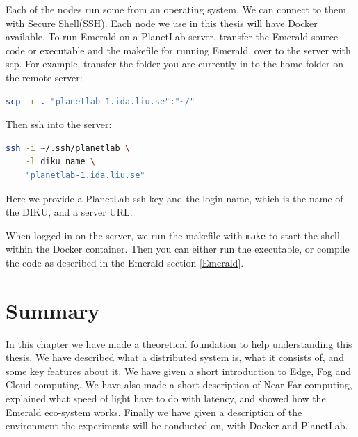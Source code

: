 Each of the nodes run some from an operating system. We can connect to them with Secure Shell(SSH). Each node we use in this thesis will have Docker available. To run Emerald on a PlanetLab server, transfer the Emerald source code or executable and the makefile for running Emerald, over to the server with scp. For example, transfer the folder you are currently in to the home folder on the remote server:
\begin{lstlisting}[language=Bash]
scp -r . "planetlab-1.ida.liu.se":"~/"
\end{lstlisting}
Then ssh into the server: 
\begin{lstlisting}[language=Bash]
ssh -i ~/.ssh/planetlab \
    -l diku_name \
    "planetlab-1.ida.liu.se"
\end{lstlisting}
Here we provide a PlanetLab ssh key and the login name, which is the name of the DIKU, and a server URL.

When logged in on the server, we run the makefile with \verb|make| to start the shell within the Docker container. Then you can either run the executable, or compile the code as described in the Emerald section \ref{Emerald}.



\section{Summary}
In this chapter we have made a theoretical foundation to help understanding this thesis. We have described what a distributed system is, what it consists of, and some key features about it. We have given a short introduction to Edge, Fog and Cloud computing. We have also made a short description of Near-Far computing, explained what speed of light have to do with latency, and showed how the Emerald eco-system works. Finally we have given a description of the environment the experiments will be conducted on, with Docker and PlanetLab.


